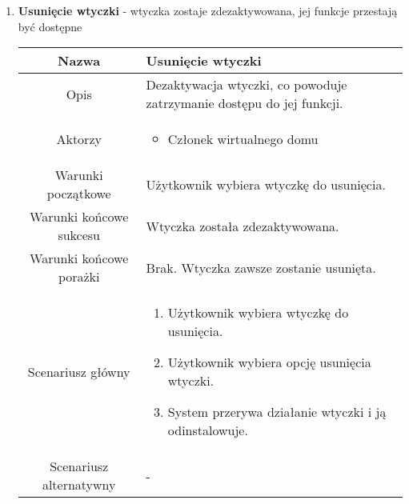 \documentclass{article}
\begin{document}
\begin{enumerate}
\begin{enumerate}
			\item \textbf{Usunięcie wtyczki} - wtyczka zostaje zdezaktywowana, jej funkcje
				przestają być dostępne
				\begin{table}[H]
					\centering
					\begin{tabular}{|c|p{7cm}|}
						\hline
						Nazwa                   & \textbf{Usunięcie wtyczki}                                                                                                                                                                     \\
						\hline
						Opis                    & Dezaktywacja wtyczki, co powoduje zatrzymanie dostępu do jej funkcji.                                                                                                                          \\
						\hline
						Aktorzy                 & \begin{itemize}\item Członek wirtualnego domu\end{itemize}                                                                                                                                     \\
						\hline
						Warunki początkowe      & Użytkownik wybiera wtyczkę do usunięcia.                                                                                                                                                       \\
						\hline
						Warunki końcowe sukcesu & Wtyczka została zdezaktywowana.                                                                                                                                                                \\
						\hline
						Warunki końcowe porażki & Brak. Wtyczka zawsze zostanie usunięta.                                                                                                                                                        \\
						\hline
						Scenariusz główny       & \begin{enumerate}\item Użytkownik wybiera wtyczkę do usunięcia.

\item Użytkownik wybiera opcję usunięcia wtyczki.

\item System przerywa działanie wtyczki i ją odinstalowuje.\end{enumerate} \\
						\hline
						Scenariusz alternatywny & -                                                                                                                                                                                              \\
						\hline
					\end{tabular}
				\end{table}


\end{enumerate}
\end{enumerate}
\end{document}
